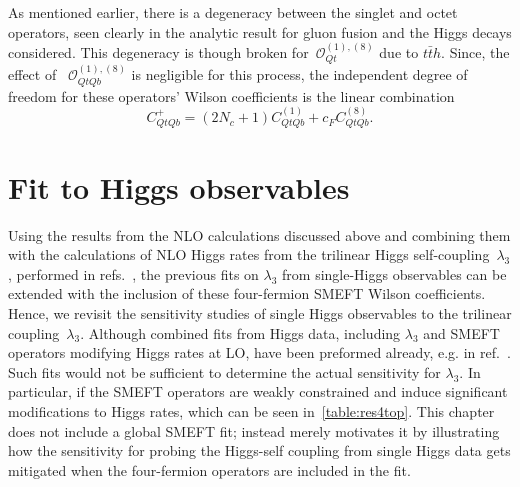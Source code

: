 	\par As mentioned earlier, there is a degeneracy between the singlet and octet operators, seen clearly in the analytic result for gluon fusion and the Higgs decays considered. This degeneracy is though broken for~$\mathcal O_{Qt}^{(1),(8)}$ due to $t\bar t h$. Since, the effect of ~$\mathcal O_{QtQb}^{(1),(8)}$ is negligible for this process, the independent degree of freedom for these operators' Wilson coefficients is the linear combination
	\begin{equation}
		C_{QtQb}^+= (2N_c+1 )C_{QtQb}^{(1)} + c_F   C_{QtQb}^{(8)}.
		\label{eq:CQtQbplus}
	\end{equation}

	\section{Fit to Higgs observables \label{sec:fit}}
	
	\par Using the results from the  NLO calculations discussed above and combining them with the calculations of NLO Higgs rates from the trilinear Higgs self-coupling~$\lambda_3$, performed in refs.~\cite{Gorbahn:2016uoy, Degrassi:2016wml, Bizon:2016wgr, Maltoni:2017ims, Degrassi:2021uik}, the previous fits on $\lambda_3$ from single-Higgs observables can be extended with the inclusion of these four-fermion SMEFT Wilson coefficients. Hence, we revisit the sensitivity studies of single Higgs observables to the trilinear coupling~$\lambda_3$.  
	Although combined fits from Higgs data, including $\lambda_3$ and SMEFT operators modifying Higgs rates at LO, have been preformed already, e.g. in ref.~\cite{DiVita:2017eyz}. Such fits would not be sufficient to determine the actual sensitivity for $\lambda_3$. In particular, if the SMEFT operators are weakly constrained and induce significant modifications to Higgs rates, which can be seen in~\autoref{table:res4top}. This chapter does not include a global SMEFT fit; instead merely motivates it by illustrating how the sensitivity for probing the Higgs-self coupling from single Higgs data gets mitigated when the four-fermion operators are included in the fit.

